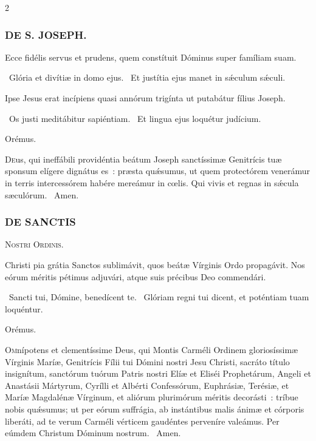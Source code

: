 \documentclass[9pt,twoside]{extarticle}
\begin{document}
\begin{multicols}{2}
{{{\subsubsection*{\center \textsc{DE S. JOSEPH.}}
\begin{tightlist}{}
\item {}
\item {} Ecce fidélis servus et prudens, quem constítuit Dóminus super famíliam suam.
\item {}~Glória et divítiæ in domo ejus. ~Et justítia ejus manet in sǽculum sǽculi.
\item {} Ipse Jesus erat incípiens quasi annórum trigínta ut putabátur fílius Joseph.
\item {}~Os justi meditábitur sapiéntiam. ~Et lingua ejus loquétur judícium.
\item Orémus. \hfill {}
\end{tightlist}
\lettrine{D}eus, qui ineffábili providéntia beátum Joseph sanctíssimæ Genitrícis tuæ sponsum elígere dignátus es~: præsta quǽsumus, ut quem protectórem venerámur in terris intercessórem habére mereámur in cœlis. Qui vivis et regnas in sǽcula sæculórum. ~Amen.

\subsubsection*{\center \textsc{DE SANCTIS}}
\begin{center}\textsc{Nostri Ordinis.}\end{center}
\begin{tightlist}{}
\item {} Christi pia grátia Sanctos sublimávit, quos beátæ Vírginis Ordo propagávit. Nos eórum méritis pétimus adjuvári, atque suis précibus Deo commendári.
\item {}~Sancti tui, Dómine, benedícent te. ~Glóriam regni tui dicent, et poténtiam tuam loquéntur.
\item Orémus. \hfill {}
\end{tightlist}
\lettrine{O}mnípotens et clementíssime Deus, qui Montis Carméli Ordinem gloriosíssimæ Vírginis Maríæ, Genitrícis Fílii tui Dómini nostri Jesu Christi, sacráto título insignítum, sanctórum tuórum Patris nostri Elíæ et Eliséi Prophetárum, Angeli et Anastásii Mártyrum, Cyrílli et Albérti Confessórum, Euphrásiæ, Terésiæ, et Maríæ Magdalénæ Vírginum, et aliórum plurimórum méritis decorásti~: tríbue nobis quǽsumus; ut per eórum suffrágia, ab instántibus malis ánimæ et córporis liberáti, ad te verum Carméli vérticem gaudéntes perveníre valeámus. Per eúmdem Christum Dóminum nostrum. ~Amen.

}}}
\end{multicols}
\end{document}
